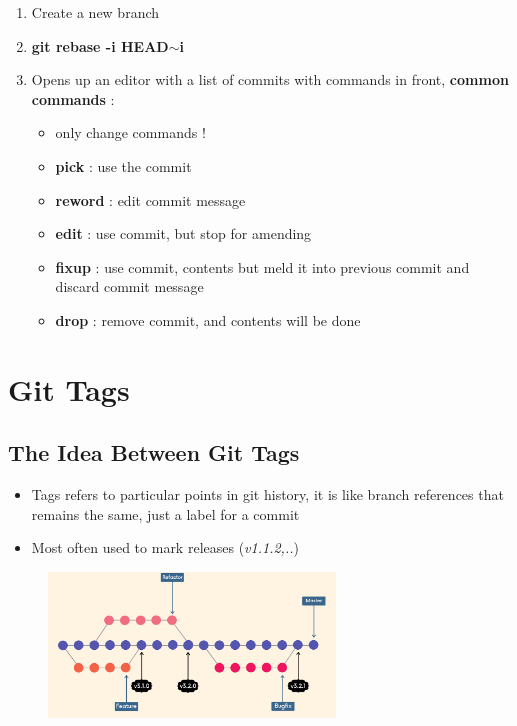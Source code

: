 \documentclass{report}
\newcommand{\warning}{
	{\fontencoding{U}\fontfamily{futs}\selectfont\char 66\relax}
}
\begin{document}
\begin{enumerate}
	\item Create a new branch 
	\item \textbf{git rebase -i HEAD$\sim$i} 
	\item Opens up an editor with a list of commits with commands in front, \textbf{common commands} :
		\begin{itemize}
			\item \warning only change commands !
			\item \textbf{pick} : use the commit 
			\item \textbf{reword} : edit commit message 
			\item \textbf{edit} : use commit, but stop for amending 
			\item \textbf{fixup} : use commit, contents but meld it into previous commit and discard commit message 
			\item \textbf{drop} : remove commit, and contents will be done
		\end{itemize}
\end{enumerate}



\chapter{Git Tags}


\section{The Idea Between Git Tags}

\begin{itemize}
	\item Tags refers to particular points in git history, it is like branch references that remains the same, just a label for a commit 
	\item Most often used to mark releases (\textit{v1.1.2,..}) 
\end{itemize}

\begin{figure}[H] 
	 \centering 
	 \includegraphics[width=3in]{screenshots/2022-07-10T01-23-06Z.png} 
\end{figure}
\end{document}
